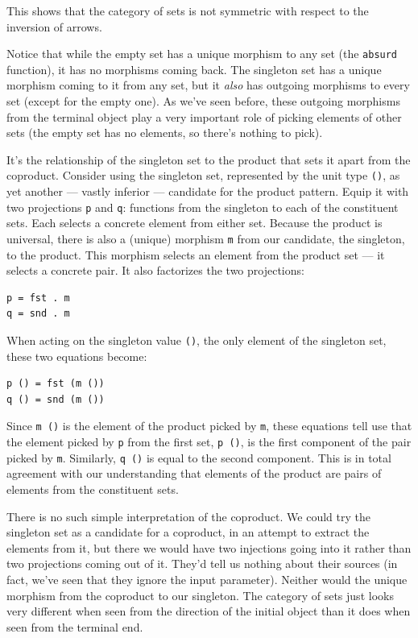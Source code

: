 This shows that the category of sets is not symmetric with respect to
the inversion of arrows.

Notice that while the empty set has a unique morphism to any set (the
\texttt{absurd} function), it has no morphisms coming back. The
singleton set has a unique morphism coming to it from any set, but it
\emph{also} has outgoing morphisms to every set (except for the empty
one). As we've seen before, these outgoing morphisms from the terminal
object play a very important role of picking elements of other sets (the
empty set has no elements, so there's nothing to pick).

It's the relationship of the singleton set to the product that sets it
apart from the coproduct. Consider using the singleton set, represented
by the unit type \texttt{()}, as yet another --- vastly inferior ---
candidate for the product pattern. Equip it with two projections
\texttt{p} and \texttt{q}: functions from the singleton to each of the
constituent sets. Each selects a concrete element from either set.
Because the product is universal, there is also a (unique) morphism
\texttt{m} from our candidate, the singleton, to the product. This
morphism selects an element from the product set --- it selects a
concrete pair. It also factorizes the two projections:

\begin{verbatim}
p = fst . m
q = snd . m
\end{verbatim}

When acting on the singleton value \texttt{()}, the only element of the
singleton set, these two equations become:

\begin{verbatim}
p () = fst (m ())
q () = snd (m ())
\end{verbatim}

Since \texttt{m ()} is the element of the product picked by \texttt{m},
these equations tell use that the element picked by \texttt{p} from the
first set, \texttt{p ()}, is the first component of the pair picked by
\texttt{m}. Similarly, \texttt{q ()} is equal to the second component.
This is in total agreement with our understanding that elements of the
product are pairs of elements from the constituent sets.

There is no such simple interpretation of the coproduct. We could try
the singleton set as a candidate for a coproduct, in an attempt to
extract the elements from it, but there we would have two injections
going into it rather than two projections coming out of it. They'd tell
us nothing about their sources (in fact, we've seen that they ignore the
input parameter). Neither would the unique morphism from the coproduct
to our singleton. The category of sets just looks very different when
seen from the direction of the initial object than it does when seen
from the terminal end.

